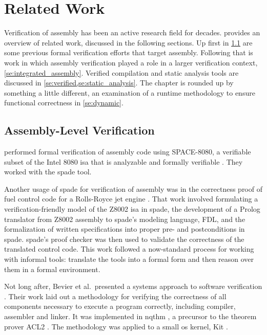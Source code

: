 \chapter{Related Work}\label{ch:related}
Verification of assembly has been an active research field for decades.
 provides an overview of related work,
discussed in the following sections.
Up first in \cref{se:previous_assembly}
are some previous formal verification efforts that target assembly.
Following that is work in which assembly verification played a role
in a larger verification context, \cref{se:integrated_assembly}.
Verified compilation and static analysis tools are discussed
in \cref{se:verified,se:static_analysis}.
The chapter is rounded up by something a little different,
an examination of a runtime methodology to ensure functional correctness
in \cref{se:dynamic}.



\section{Assembly-Level Verification}\label{se:previous_assembly}
\textcite{clutterbuck1988verification} performed formal verification
of assembly code using SPACE-8080, a verifiable subset of the Intel 8080
\ac{isa} that is analyzable and formally verifiable \autocite{carre1986spade}.
They worked with the \ac{spade} tool.

Another usage of \ac{spade} for verification of assembly
was in the correctness proof of fuel control code for a Rolls-Royce
jet engine \autocite{oneill1988verification}.
That work involved formulating a verification-friendly model of the Z8002 \ac{isa}
in \ac{spade}, the development of a Prolog translator from Z8002 assembly
to \ac{spade}'s modeling language, FDL,
and the formalization of written specifications into proper pre- and postconditions
in \ac{spade}. \Ac{spade}'s proof checker was then used to validate the correctness
of the translated control code.
This work followed a now-standard process for working with informal tools:
translate the tools into a formal form and then reason over them
in a formal environment.

Not long after, Bevier et al.\ presented a systems approach
to software verification \autocite{bevier1989approach,boyer1979computational}.
Their work laid out a methodology for verifying the correctness
of all components necessary to execute a program correctly,
including compiler, assembler and linker.
It was implemented in \ac{nqthm} \autocite{boyer1979computational},
a precursor to the theorem prover ACL2 \autocite{ACL2}.
The methodology was applied to a small \ac{os} kernel, Kit \autocite{bevier1989kit}.

